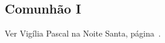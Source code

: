 
\subsection{Comunhão I}\label{subsection:tempus-paschale/dominica-resurrectionis/communio-1}

\begin{rubrica}
    Ver Vigília Pascal na Noite Santa, página~\pageref{subsection:hebdomada-sancta/ad-vigiliam-paschalem-in-nocte-sancta/communio}.
\end{rubrica}